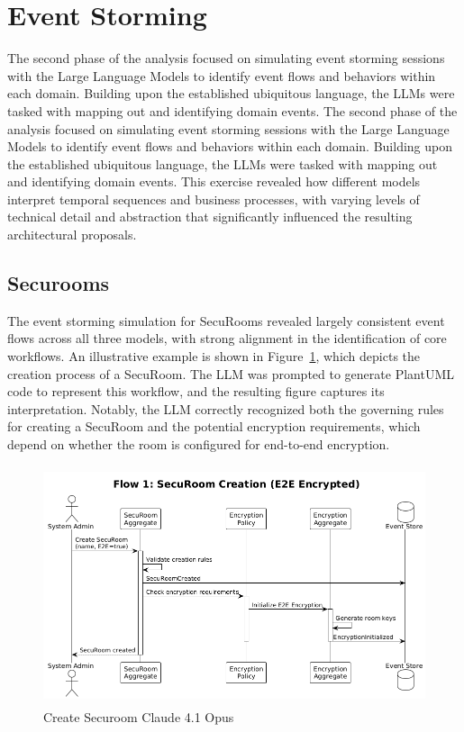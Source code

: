 \section{Event Storming}
The second phase of the analysis focused on simulating event storming sessions with the Large Language Models to identify event flows and behaviors within each domain. Building upon the established ubiquitous language, the LLMs were tasked with mapping out and identifying domain events. The second phase of the analysis focused on simulating event storming sessions with the Large Language Models to identify event flows and behaviors within each domain. Building upon the established ubiquitous language, the LLMs were tasked with mapping out and identifying domain events. This exercise revealed how different models interpret temporal sequences and business processes, with varying levels of technical detail and abstraction that significantly influenced the resulting architectural proposals.

\subsection{Securooms}
The event storming simulation for SecuRooms revealed largely consistent event flows across all three models, with strong alignment in the identification of core workflows. An illustrative example is shown in Figure~\ref{fig:event-create-securoom-claude}, which depicts the creation process of a SecuRoom. The LLM was prompted to generate PlantUML code to represent this workflow, and the resulting figure captures its interpretation. Notably, the LLM correctly recognized both the governing rules for creating a SecuRoom and the potential encryption requirements, which depend on whether the room is configured for end-to-end encryption.

\begin{figure}[H]
  \centering
  \begin{adjustbox}{max width=\textwidth}
      \includegraphics[height=7cm]{figures/create-securoom-claude.png} 
  \end{adjustbox}
  \caption{Create Securoom Claude 4.1 Opus}
  \label{fig:event-create-securoom-claude} 
\end{figure}

